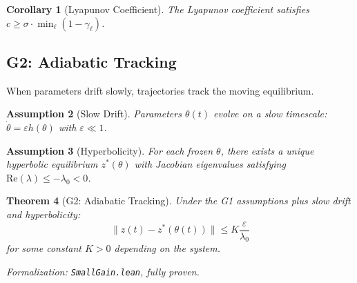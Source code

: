 \documentclass[12pt]{article}
\newtheorem{theorem}{Theorem}[section]
\newtheorem{corollary}[theorem]{Corollary}
\newtheorem{assumption}[theorem]{Assumption}
\begin{document}
\begin{corollary}[Lyapunov Coefficient]
\label{cor:lyap-coeff}
The Lyapunov coefficient satisfies $c \geq \sigma \cdot \min_\ell (1 - \gamma_\ell)$.
\end{corollary}

\subsection{G2: Adiabatic Tracking}

When parameters drift slowly, trajectories track the moving equilibrium.

\begin{assumption}[Slow Drift]
Parameters $\theta(t)$ evolve on a slow timescale: $\dot{\theta} = \varepsilon h(\theta)$ with $\varepsilon \ll 1$.
\end{assumption}

\begin{assumption}[Hyperbolicity]
For each frozen $\theta$, there exists a unique hyperbolic equilibrium $z^*(\theta)$ with Jacobian eigenvalues satisfying $\text{Re}(\lambda) \leq -\lambda_0 < 0$.
\end{assumption}

\begin{theorem}[G2: Adiabatic Tracking]
\label{thm:g2}
Under the G1 assumptions plus slow drift and hyperbolicity:
\[
\|z(t) - z^*(\theta(t))\| \leq K \frac{\varepsilon}{\lambda_0}
\]
for some constant $K > 0$ depending on the system.
\end{theorem}
\noindent\textit{Formalization: \texttt{SmallGain.lean}, fully proven.}
\end{document}
